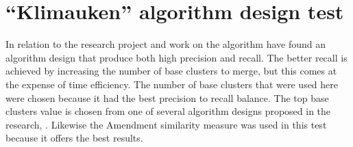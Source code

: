 


\section{``Klimauken'' algorithm design test}
In relation to the  research project and work on the \CTC algorithm \cite{Moe2014compact} have found an algorithm design that produce both high precision and recall. The better recall is achieved by increasing the number of base clusters to merge, but this comes at the expense of time efficiency. The number of base clusters that were used here were chosen because it had the best precision to recall balance. The top base clusters value is chosen from one of several algorithm designs proposed in the research, \parencite{Moe2014compact}. Likewise the Amendment similarity measure was used in this test because it offers the best results.

